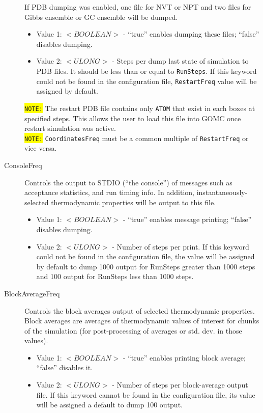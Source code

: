 \begin{description}
If PDB dumping was enabled, one file for NVT or NPT and two files for Gibbs ensemble or GC ensemble will be dumped.
	\begin{itemize}
	\item Value 1: $<BOOLEAN>$ - ``true'' enables dumping these files; ``false'' disables dumping.
	\item Value 2: $<ULONG>$ - Steps per dump last state of simulation to PDB files. It should be less than or equal to \texttt{RunSteps}. If this keyword could not be found in the configuration file, \texttt{RestartFreq} value will be assigned by default.
	\end{itemize}
	\colorbox{yellow}{\texttt{NOTE:}} The restart PDB file contains only \texttt{ATOM} that exist in each boxes at specified steps. This allows the user to load this file into GOMC once restart simulation was active.\\
	\colorbox{yellow}{\texttt{NOTE:}} \texttt{CoordinatesFreq} must be a common multiple of \texttt{RestartFreq} or vice versa.
\item [ConsoleFreq] Controls the output to STDIO (``the console'') of messages such as acceptance statistics, and run timing info. In addition, instantaneously-selected thermodynamic properties will be output to this file.
	\begin{itemize}
	\item Value 1: $<BOOLEAN>$ - ``true'' enables message printing; ``false'' disables dumping.
	\item Value 2: $<ULONG>$ - Number of steps per print. If this keyword could not be found in the configuration file, the value will be assigned by default to dump 1000 output for RunSteps greater than 1000 steps and 100 output for RunSteps less than 1000 steps.
	\end{itemize}
\item [BlockAverageFreq] Controls the block averages output of selected thermodynamic properties. Block averages are averages of thermodynamic values of interest for chunks of the simulation (for post-processing of averages or std. dev. in those values).
	\begin{itemize}
	\item Value 1: $<BOOLEAN>$ - ``true'' enables printing block average; ``false'' disables it.
	\item Value 2: $<ULONG>$ - Number of steps per block-average output file. If this keyword cannot be found in the configuration file, its value will be assigned a default to dump 100 output.
	\end{itemize}

\end{description}
